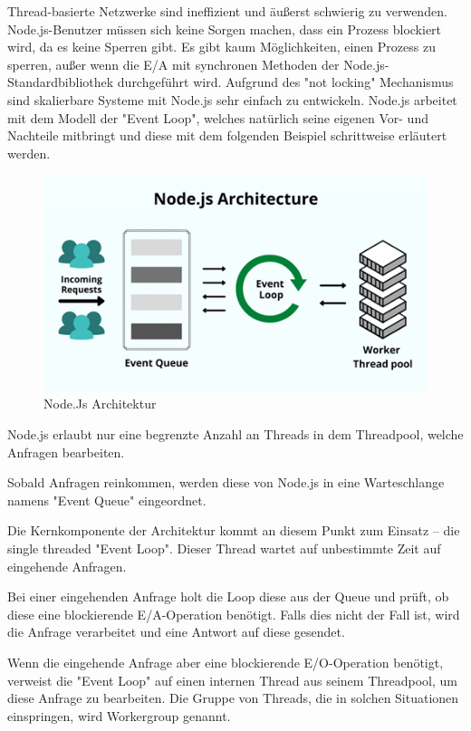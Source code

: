 Thread-basierte Netzwerke sind ineffizient und äußerst schwierig zu verwenden. Node.js-Benutzer müssen sich keine Sorgen machen, dass ein Prozess blockiert wird, da es keine Sperren gibt. Es gibt kaum Möglichkeiten, einen Prozess zu sperren, außer wenn die E/A mit synchronen Methoden der Node.js-Standardbibliothek durchgeführt wird. Aufgrund des "not locking" Mechanismus sind skalierbare Systeme mit Node.js sehr einfach zu entwickeln. 
Node.js arbeitet mit dem Modell der "Event Loop", welches natürlich seine eigenen Vor- und Nachteile mitbringt und diese mit dem folgenden Beispiel schrittweise erläutert werden.


\begin{figure}[H]
    \centering
    \includegraphics{media/NodeJs/NodeJsArchitektur.png}
    \caption{Node.Js Architektur\cite{ArchitekturFoto}}
\end{figure}


Node.js erlaubt nur eine begrenzte Anzahl an Threads in dem Threadpool, welche Anfragen bearbeiten.

Sobald Anfragen reinkommen, werden diese von Node.js in eine Warteschlange namens "Event Queue" eingeordnet. 

Die Kernkomponente der Architektur kommt an diesem Punkt zum Einsatz – die single threaded "Event Loop". Dieser Thread wartet auf unbestimmte Zeit auf eingehende Anfragen.

Bei einer eingehenden Anfrage holt die Loop diese aus der Queue und prüft, ob diese eine blockierende E/A-Operation benötigt. Falls dies nicht der Fall ist, wird die Anfrage verarbeitet und eine Antwort auf diese gesendet. 

Wenn die eingehende Anfrage aber eine blockierende E/O-Operation benötigt, verweist die "Event Loop" auf einen internen Thread aus seinem Threadpool, um diese Anfrage zu bearbeiten. Die Gruppe von Threads, die in solchen Situationen einspringen, wird Workergroup genannt.

